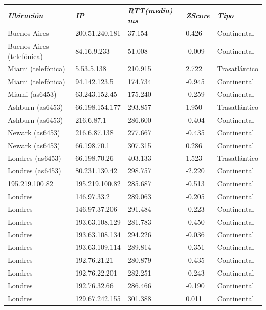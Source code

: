 \begin{tabular}{lllll}
	\textit{\textbf{Ubicaci\'on}}	&	\textit{\textbf{IP}}	&	\textit{\textbf{RTT(media) ms}}	&	\textit{\textbf{ZScore}}	&	\textit{\textbf{Tipo}}	\\
	Buenos Aires			&	200.51.240.181	&	37.154	&	0.426	&	Continental	\\
	Buenos Aires (telef\'onica)	&	84.16.9.233	&	51.008	&	-0.009	&	Continental	\\
	Miami (telef\'onica)		&	5.53.5.138	&	210.915	&	2.722	&	Trasatl\'antico	\\
	Miami (telef\'onica)		&	94.142.123.5	&	174.734	&	-0.945	&	Continental	\\
	Miami (as6453)			&	63.243.152.45	&	175.240	&	-0.259	&	Continental	\\
	Ashburn (as6453)		&	66.198.154.177	&	293.857	&	1.950	&	Trasatl\'antico	\\
	Ashburn (as6453)		&	216.6.87.1	&	286.600	&	-0.404	&	Continental	\\
	Newark (as6453)			&	216.6.87.138	&	277.667	&	-0.435	&	Continental	\\
	Newark (as6453)			&	66.198.70.1	&	307.315	&	0.286	&	Continental	\\
	Londres (as6453)		&	66.198.70.26	&	403.133	&	1.523	&	Trasatl\'antico	\\
	Londres (as6453)		&	80.231.130.42	&	298.757	&	-2.220	&	Continental	\\
	195.219.100.82			&	195.219.100.82	&	285.687	&	-0.513	&	Continental	\\
	Londres				&	146.97.33.2	&	289.063	&	-0.205	&	Continental	\\
	Londres				&	146.97.37.206	&	291.484	&	-0.223	&	Continental	\\
	Londres				&	193.63.108.129	&	281.783	&	-0.450	&	Continental	\\
	Londres				&	193.63.108.134	&	294.226	&	-0.036	&	Continental	\\
	Londres				&	193.63.109.114	&	289.814	&	-0.351	&	Continental	\\
	Londres				&	192.76.21.21	&	280.879	&	-0.435	&	Continental	\\
	Londres				&	192.76.22.201	&	282.251	&	-0.243	&	Continental	\\
	Londres				&	192.76.32.66	&	286.466	&	-0.190	&	Continental	\\
	Londres				&	129.67.242.155	&	301.388	&	0.011	&	Continental	\\

\end{tabular}

